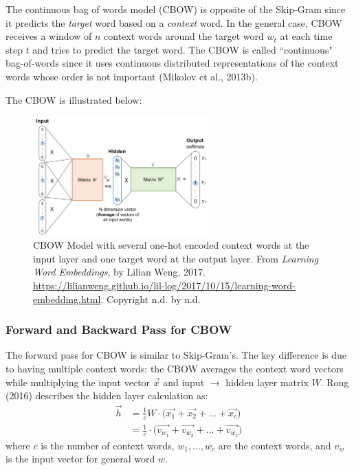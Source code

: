 The continuous bag of words model (CBOW) is opposite of the Skip-Gram since it predicts the \emph{target} word based on a \emph{context} word. In the general case, CBOW receives a window of $n$ context words around the target word $w_t$ at each time step $t$ and tries to predict the target word. The CBOW is called ``continuous" bag-of-words since it uses continuous distributed representations of the context words whose order is not important (Mikolov et al., 2013b). 

The CBOW is illustrated below: 

\begin{figure}[h]
\centering
\includegraphics[width=0.6\textwidth]{imgs/cbow.png}
\caption{CBOW Model with several one-hot encoded context words at the input layer and one target word at the output layer. From \emph{Learning Word Embeddings}, by Lilian Weng, 2017. \url{https://lilianweng.github.io/lil-log/2017/10/15/learning-word-embedding.html}. Copyright n.d. by n.d.}
\end{figure}

\subsubsection{Forward and Backward Pass for CBOW}

The forward pass for CBOW is similar to Skip-Gram's. The key difference is due to having multiple context words: the CBOW averages the context word vectors while multiplying the input vector $\overrightarrow{x}$ and input $\rightarrow$ hidden layer matrix $W$. Rong (2016) describes the hidden layer calculation as: 
$$
\begin{array}{ll}
\overrightarrow{h} 
&= \frac{1}{c} W \cdot \Big(\overrightarrow{x_1} + \overrightarrow{x_2} + ... + \overrightarrow{x_c} \Big) \\
&= \frac{1}{c} \cdot \Big(\overrightarrow{v_{w_1}} + \overrightarrow{v_{w_2}} + ... + \overrightarrow{v_{w_c}} \Big)
\end{array}
$$
where $c$ is the number of context words, $w_1,...,w_c$ are the context words, and $v_w$ is the input vector for general word $w$. 

